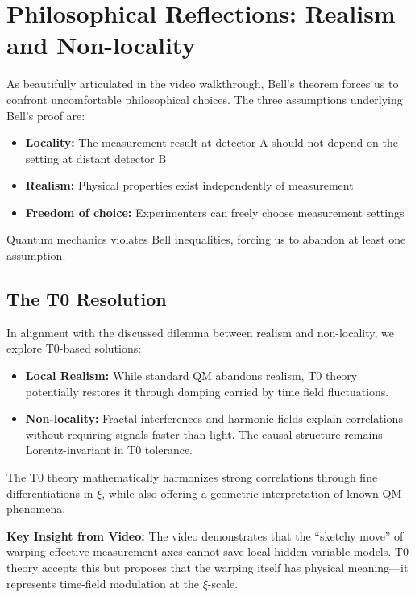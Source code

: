 \section{Philosophical Reflections: Realism and Non-locality}
\label{sec:philosophy}

As beautifully articulated in the video walkthrough\cite{youtube_bell2025}, Bell's theorem forces us to confront uncomfortable philosophical choices. The three assumptions underlying Bell's proof are:
\begin{itemize}
\item \textbf{Locality:} The measurement result at detector A should not depend on the setting at distant detector B
\item \textbf{Realism:} Physical properties exist independently of measurement
\item \textbf{Freedom of choice:} Experimenters can freely choose measurement settings
\end{itemize}

Quantum mechanics violates Bell inequalities, forcing us to abandon at least one assumption.

\subsection{The T0 Resolution}

In alignment with the discussed dilemma between realism and non-locality, we explore T0-based solutions:

\begin{itemize}
\item \textbf{Local Realism:} While standard QM abandons realism, T0 theory potentially restores it through damping carried by time field fluctuations.
\item \textbf{Non-locality:} Fractal interferences and harmonic fields explain correlations without requiring signals faster than light. The causal structure remains Lorentz-invariant in T0 tolerance.
\end{itemize}

The T0 theory mathematically harmonizes strong correlations through fine differentiations in $\xi$, while also offering a geometric interpretation of known QM phenomena.

\textbf{Key Insight from Video:} The video demonstrates that the ``sketchy move'' of warping effective measurement axes cannot save local hidden variable models. T0 theory accepts this but proposes that the warping itself has physical meaning—it represents time-field modulation at the $\xi$-scale.

